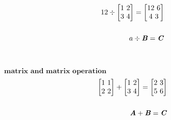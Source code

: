 \documentclass[12pt]{minimal}
\begin{document}
\begin{equation}
    \begin{split}
        12 \div
        \begin{bmatrix}
            1\ 2\\
            3\ 4\\
        \end{bmatrix} = 
        \begin{bmatrix}
            12\ 6\\
            4\ 3\\
        \end{bmatrix} \\ \\
        a \div \textbf{\textit{B}} = \textbf{\textit{C}} 
    \end{split}
\end{equation} \\ \\



$\textbf{matrix and matrix operation}$ \\ 

\begin{equation}
    \begin{split}
        \begin{bmatrix}
            1\ 1\\
            2\ 2\\
        \end{bmatrix} +
        \begin{bmatrix}
            1\ 2\\
            3\ 4\\
        \end{bmatrix} =
        \begin{bmatrix}
            2\ 3\\
            5\ 6\\
        \end{bmatrix} \\ \\ 
        \textbf{\textit{A}}+\textbf{\textit{B}}=\textbf{\textit{C}} 
    \end{split}
\end{equation} \\ \\
\end{document}
